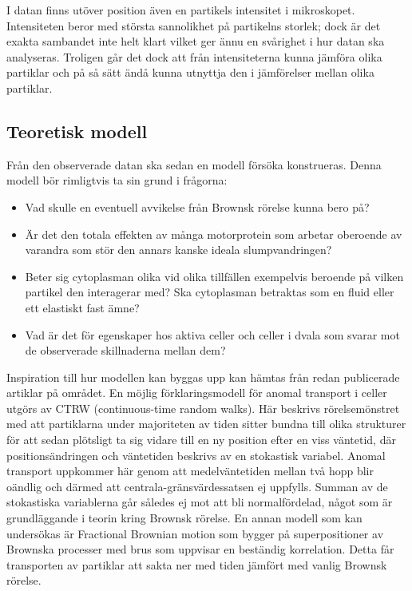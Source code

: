 I datan finns utöver position även en partikels intensitet i mikroskopet. Intensiteten beror med största sannolikhet på partikelns storlek; dock är det exakta sambandet inte helt klart vilket ger ännu en svårighet i hur datan ska analyseras. Troligen går det dock att från intensiteterna kunna jämföra olika partiklar och på så sätt ändå kunna utnyttja den i jämförelser mellan olika partiklar. 

\subsection{Teoretisk modell}

Från den observerade datan ska sedan en modell försöka konstrueras. Denna modell bör rimligtvis ta sin grund i frågorna:
\begin{itemize}
    \item Vad skulle en eventuell avvikelse från Brownsk rörelse kunna bero på?
    \item Är det den totala effekten av många motorprotein som arbetar oberoende av varandra som stör den annars kanske ideala slumpvandringen? 
    \item Beter sig cytoplasman olika vid olika tillfällen exempelvis beroende på vilken partikel den interagerar med? Ska cytoplasman betraktas som en fluid eller ett elastiskt fast ämne?
    \item Vad är det för egenskaper hos aktiva celler och celler i dvala som svarar mot de observerade skillnaderna mellan dem?
\end{itemize}

Inspiration till hur modellen kan byggas upp kan hämtas från redan publicerade artiklar på området. En möjlig förklaringsmodell för anomal transport i celler utgörs av CTRW (continuous-time random walks). Här beskrivs rörelsemönstret med att partiklarna under majoriteten av tiden sitter bundna till olika strukturer för att sedan plötsligt ta sig vidare till en ny position efter en viss väntetid, där positionsändringen och väntetiden beskrivs av en stokastisk variabel. Anomal transport uppkommer här genom att medelväntetiden mellan två hopp blir oändlig och därmed att centrala-gränsvärdessatsen ej uppfylls. Summan av de stokastiska variablerna går således ej mot att bli normalfördelad, något som är grundläggande i teorin kring Brownsk rörelse.
En annan modell som kan undersökas är Fractional Brownian motion som bygger på superpositioner av Brownska processer med brus som uppvisar en beständig korrelation. Detta får transporten av partiklar att sakta ner med tiden jämfört med vanlig Brownsk rörelse. \cite{Hofling_Franosch}


